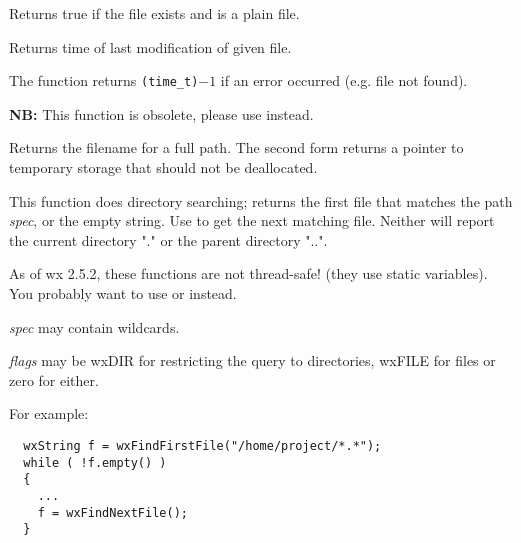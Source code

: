 
Returns true if the file exists and is a plain file.


\label{wxfilemodificationtime}


Returns time of last modification of given file.

The function returns \texttt{(time\_t)}$-1$ if an error occurred (e.g. file not
found).


\label{wxfilenamefrompath}



{\bf NB:} This function is obsolete, please use
 instead.

Returns the filename for a full path. The second form returns a pointer to
temporary storage that should not be deallocated.


\label{wxfindfirstfile}


This function does directory searching; returns the first file
that matches the path {\it spec}, or the empty string. Use  to
get the next matching file. Neither will report the current directory "." or the
parent directory "..".


As of wx 2.5.2, these functions are not thread-safe! (they use static variables). You probably want to use  or  instead.

{\it spec} may contain wildcards.

{\it flags} may be wxDIR for restricting the query to directories, wxFILE for files or zero for either.

For example:

\begin{verbatim}
  wxString f = wxFindFirstFile("/home/project/*.*");
  while ( !f.empty() )
  {
    ...
    f = wxFindNextFile();
  }
\end{verbatim}


